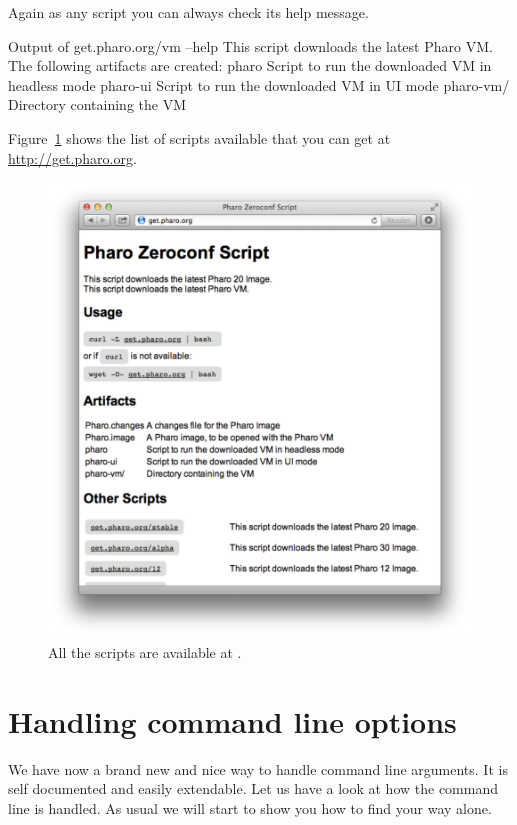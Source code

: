 \documentclass[a4paper,10pt,twoside]{book}
\begin{document}
Again as any script you can always check its help message.

\begin{code}[]{Output of get.pharo.org/vm --help}
This script downloads the latest Pharo VM.
The following artifacts are created:
    pharo      Script to run the downloaded VM in headless mode
    pharo-ui   Script to run the downloaded VM in UI mode
    pharo-vm/  Directory containing the VM
\end{code}


Figure~\ref{fig:website} shows the list of scripts available that you can get at \url{http://get.pharo.org}.

\begin{figure}[!h]
	\centering
	\includegraphics[width=\textwidth]{zeroconfwebsite}
	\caption{All the scripts are available at  \label{fig:website}.}
\end{figure}



\section{Handling command line options}
We have now a brand new and nice way to handle command line arguments. It is self documented and easily extendable. Let us have a look at how the command line is handled. As usual we will start to show you how to find your way alone.
\end{document}
